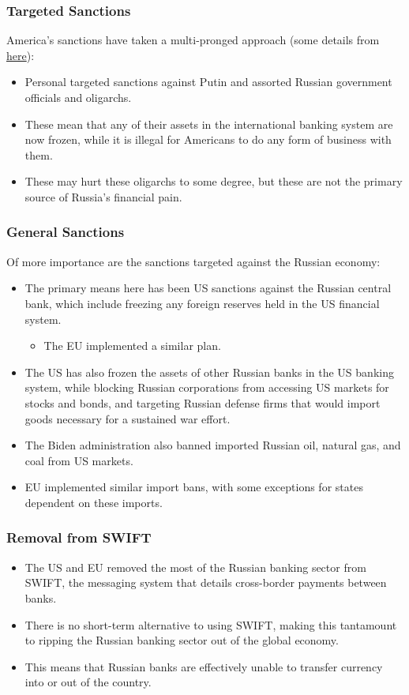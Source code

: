 \documentclass[handout]{beamer}
\begin{document}
\begin{frame} 
	\frametitle{\LARGE{Targeted Sanctions}}
	America's sanctions have taken a multi-pronged approach (some details from \href{https://www.vox.com/22968949/russia-sanctions-swift-economy-mcdonalds}{here}):
	\begin{itemize}
		\item Personal targeted sanctions against Putin and assorted Russian government officials and oligarchs. \pause
		\item These mean that any of their assets in the international banking system are now frozen, while it is illegal for Americans to do any form of business with them.
		\item These may hurt these oligarchs to some degree, but these are not the primary source of Russia's financial pain.
	\end{itemize}
\end{frame}

\begin{frame} 
	\frametitle{\LARGE{General Sanctions}}
	Of more importance are the sanctions targeted against the Russian economy:
	\begin{itemize}
		\item The primary means here has been US sanctions against the Russian central bank, which include freezing any foreign reserves held in the US financial system.
		\begin{itemize}
			\item The EU implemented a similar plan. \pause
		\end{itemize}
		\item The US has also frozen the assets of other Russian banks in the US banking system, while blocking Russian corporations from accessing US markets for stocks and bonds, and targeting Russian defense firms that would import goods necessary for a sustained war effort. \pause
		\item The Biden administration also banned imported Russian oil, natural gas, and coal from US markets. \pause
		\item EU implemented similar import bans, with some exceptions for states dependent on these imports.
	\end{itemize}
\end{frame}

\begin{frame} 
	\frametitle{\LARGE{Removal from SWIFT}}
	\begin{itemize}
		\item The US and EU removed the most of the Russian banking sector from SWIFT, the messaging system that details cross-border payments between banks. \pause
		\item There is no short-term alternative to using SWIFT, making this tantamount to ripping the Russian banking sector out of the global economy.
		\item This means that Russian banks are effectively unable to transfer currency into or out of the country.
	\end{itemize}
\end{frame}
\end{document}
